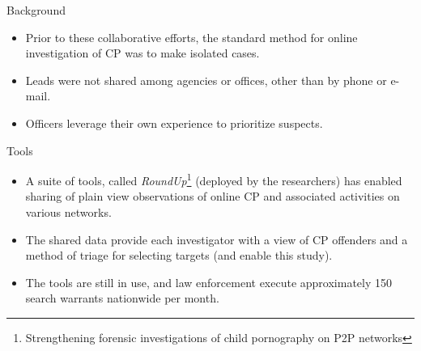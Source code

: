 \documentclass[notes]{beamer}
\begin{document}
\begin{frame}

\begin{block}{Background}

\begin{itemize}

\item[\checkmark]Prior to these collaborative efforts, the standard method for online investigation of CP was to make isolated cases.

\item[\checkmark]Leads were not shared among agencies or offices, other than by phone or e-mail.

\item[\checkmark]Officers leverage their own experience to prioritize suspects.

\end{itemize}

\end{block}

\end{frame}

\begin{frame}

\begin{block}{Tools}

\begin{itemize}

\item[\checkmark]A suite of tools, called \textit{RoundUp}\footnote{Strengthening forensic investigations of child pornography on P2P networks\cite{Liberatore}} (deployed by the researchers) has enabled sharing of plain view observations of online CP and associated activities on various networks.

\item[\checkmark]The shared data provide each investigator with a view of CP offenders and a method of triage for selecting targets  (and enable this study).

\item[\checkmark]The tools are still in use, and law enforcement execute approximately 150 search warrants nationwide per month.

\end{itemize}

\end{block}

\end{frame}
\end{document}
